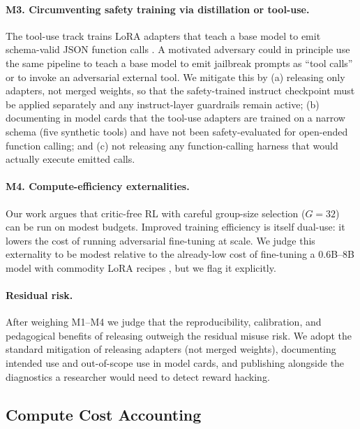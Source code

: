 \paragraph{M3. Circumventing safety training via distillation or tool-use.}
The tool-use track trains LoRA adapters that teach a base model to emit
schema-valid JSON function calls \cite{liu2024xlam}. A motivated adversary
could in principle use the same pipeline to teach a base model to emit
jailbreak prompts as ``tool calls'' or to invoke an adversarial external
tool. We mitigate this by (a) releasing only adapters, not merged weights,
so that the safety-trained instruct checkpoint must be applied separately
and any instruct-layer guardrails remain active; (b) documenting in model
cards that the tool-use adapters are trained on a narrow schema (five
synthetic tools) and have not been safety-evaluated for open-ended function
calling; and (c) not releasing any function-calling harness that would
actually execute emitted calls.

\paragraph{M4. Compute-efficiency externalities.}
Our work argues that critic-free RL with careful group-size selection
(\(G{=}32\)) can be run on modest budgets. Improved training efficiency is
itself dual-use: it lowers the cost of running adversarial fine-tuning at
scale. We judge this externality to be modest relative to the already-low
cost of fine-tuning a 0.6B--8B model with commodity LoRA recipes
\cite{hu2022lora}, but we flag it explicitly.

\paragraph{Residual risk.}
After weighing M1--M4 we judge that the reproducibility, calibration, and
pedagogical benefits of releasing \ours{} outweigh the residual misuse
risk. We adopt the standard mitigation of releasing adapters (not merged
weights), documenting intended use and out-of-scope use in model cards,
and publishing alongside the diagnostics a researcher would need to detect
reward hacking.

\subsection{Compute Cost Accounting}
\label{sec:compute_accounting}

